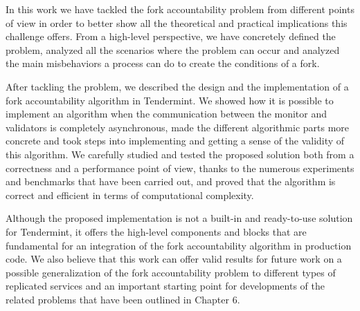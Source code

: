 \documentclass[a4paper,11pt,oneside]{report}
\begin{document}
In this work we have tackled the fork accountability problem from different points of view in order to better show all the theoretical and practical implications this challenge offers. From a high-level perspective, we have concretely defined the problem, analyzed all the scenarios where the problem can occur and analyzed the main misbehaviors a process can do to create the conditions of a fork.

After tackling the problem, we described the design and the implementation of a fork accountability algorithm in Tendermint. We showed how it is possible to implement an algorithm when the communication between the monitor and validators is completely asynchronous, made the different algorithmic parts more concrete and took steps into implementing and getting a sense of the validity of this algorithm. We carefully studied and tested the proposed solution both from a correctness and a performance point of view, thanks to the numerous experiments and benchmarks that have been carried out, and proved that the algorithm is correct and efficient in terms of computational complexity. 

Although the proposed implementation is not a built-in and ready-to-use solution for Tendermint, it offers the high-level components and blocks that are fundamental for an integration of the fork accountability algorithm in production code. We also believe that this work can offer valid results for future work on a possible generalization of the fork accountability problem to different types of replicated services and an important starting point for developments of the related problems that have been outlined in Chapter 6.

\makeacks


\cleardoublepage
{}
{}

%
%
\end{document}
